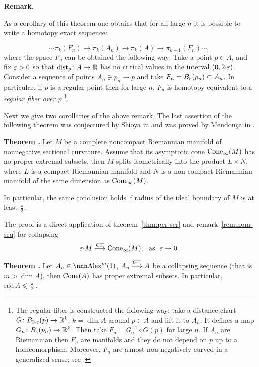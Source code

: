 \documentclass{article}
\begin{document}
\begin{thm}{\bf Remark.}\label{rem:hom-seq} {\rm 
As a corollary of this theorem one obtains that for all large $n$
it is possible to write a homotopy exact sequence:

$$\cdots\pi_k(F_n)
\longrightarrow\pi_k(A_n) \longrightarrow\pi_k(A) 
\longrightarrow\pi_{k-1}(F_n)\cdots,$$
where the space $F_n$ can be obtained the following way:
Take a point $p\in A$, and fix $\varepsilon>0$ so that $\operatorname{dist}_p\colon A\to\mathbb{R}$ has no critical values
in the interval $(0,2{\cdot}\varepsilon)$. 
Consider a sequence of points $A_n\ni p_n\to p$ and take 
$F_n=B_\varepsilon(p_n)\subset A_n$.
In particular, if $p$ is a regular point then for large $n$, $F_n$ is homotopy
equivalent to a \emph{regular fiber over $p$}%
\footnote{\label{reg-fib} The regular fiber is constructed the
following way: take a distance chart $G\colon B_{2{\cdot}\varepsilon}(p)\to \mathbb{R}^{k}$, $k=\dim A$ around $p\in A$
and lift it to $A_n$. 
It defines a map $G_n\colon B_\varepsilon(p_n)\to\mathbb{R}^k$.
Then take
$F_n=G_n^{-1}\circ G(p)$ for large $n$. 
If $A_n$ are Riemannian then $F_n$ are manifolds and they do not depend on $p$ up to a homeomorphism.
Moreover, $F_n$ are almost non-negatively curved in a generalized sense; 
see \cite[definition 1.4]{KPT}.}. }
\end{thm}

Next we give two corollaries of the above
remark.
The last assertion of the following theorem was conjectured by Shioya in
\cite{shioya} and  was proved by Mendon\c{c}a in \cite{mendonca:shioya}.

\begin{thm}{\bf Theorem \cite[3.1]{perelman:collapsing}.} 
Let $M$ be a complete noncompact Riemannian manifold of
nonnegative sectional curvature. 
Assume that its asymptotic cone $\operatorname{Cone}_\infty(M)$
has no proper extremal subsets, then $M$ splits isometrically into the product
$L\times N$, where $L$ is a compact Riemannian manifold and $N$ is a non-compact
Riemannian manifold of the same dimension as $\operatorname{Cone}_\infty(M)$.

In particular, the same conclusion holds if radius of the ideal boundary of $M$ is
at least $\tfrac\pi2$.
\end{thm}

The proof is a direct application of theorem~\ref{thm:per-ser} and remark~\ref{rem:hom-seq}
for collapsing 
$$\eps{\cdot} M\GHto\Cone_\infty(M),\ \ \text{as}\ \ \eps\to0.$$



\begin{thm}{\bf Theorem \cite[3.2]{perelman:collapsing}.}
Let $A_n\in\Alex^m(1)$, $A_n\GHto A$ be a collapsing sequence 
(that is $m>\dim A$), 
then $\operatorname{Cone}(A)$ has proper
extremal subsets.
In particular, $\operatorname{rad} A\leqslant\tfrac\pi2$.
\end{thm}
\end{document}

